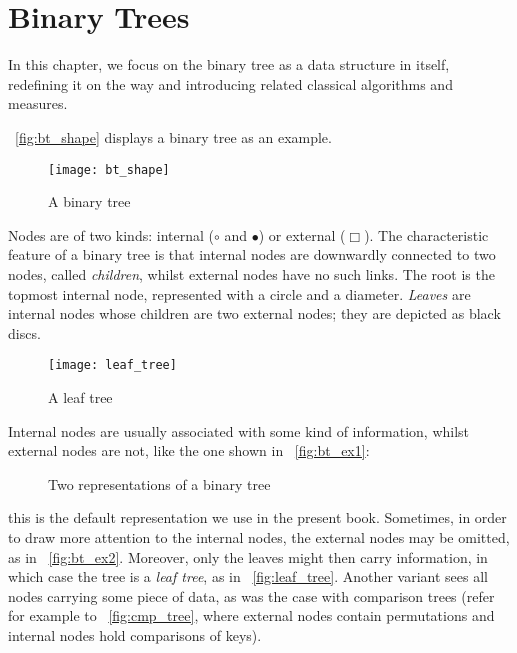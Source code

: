 \chapter{Binary Trees}
\label{binary tree}

In this chapter, we focus on the binary tree as a data structure in
itself, redefining it on the way and introducing related classical
algorithms and measures.

\Fig~\vref{fig:bt_shape} displays a binary tree as an example.
\begin{figure}
\centering
\texttt{[image: bt\_shape]}
\caption{A binary tree}
\label{fig:bt_shape}
\end{figure}
Nodes are of two kinds: internal
(\(\circ\) and \(\bullet\)) or external (\(\scriptstyle \Box\)). The characteristic feature of a
binary tree is that internal nodes are downwardly connected to two
nodes, called \emph{children}, whilst external
nodes have no such links. The root is the
topmost internal node, represented with a circle and a diameter.
\emph{Leaves} are internal nodes whose
children are two external nodes; they are depicted as black discs.

%
\begin{wrapfigure}[8]{r}[0pt]{0pt}
\centering
\texttt{[image: leaf\_tree]}%
\caption{A leaf tree}
\label{fig:leaf_tree}
\end{wrapfigure}
Internal nodes are usually associated with some kind of information,
whilst external nodes are not, like the one shown in
\fig~\vref{fig:bt_ex1}:
\begin{figure}
\centering
{}
\qquad
{}
\caption{Two representations of a binary tree}
\label{fig:bt_ex}
\end{figure}
this is the default representation we use in the present
book. Sometimes, in order to draw more attention to the internal
nodes, the external nodes may be omitted, as in
\fig~\vref{fig:bt_ex2}. Moreover, only the leaves might then carry
information, in which case the tree is a \emph{leaf tree}, as in \fig~\vref{fig:leaf_tree}. Another variant
sees all nodes carrying some piece of data, as was the case with
comparison trees (refer for example to \fig~\vref{fig:cmp_tree}, where
external nodes contain permutations and internal nodes hold
comparisons of keys).

